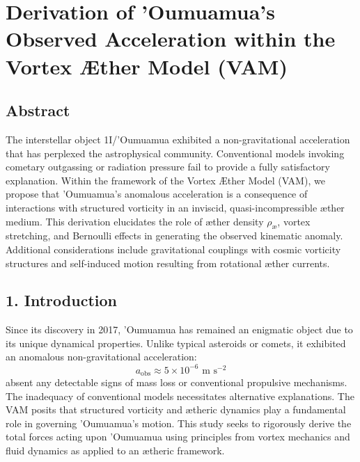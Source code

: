

    \section{Derivation of 'Oumuamua's Observed Acceleration within the Vortex Æther Model (VAM)}

    \subsection*{Abstract}
    The interstellar object 1I/'Oumuamua exhibited a non-gravitational acceleration that has perplexed the astrophysical community. Conventional models invoking cometary outgassing or radiation pressure fail to provide a fully satisfactory explanation. Within the framework of the Vortex Æther Model (VAM), we propose that 'Oumuamua's anomalous acceleration is a consequence of interactions with structured vorticity in an inviscid, quasi-incompressible æther medium. This derivation elucidates the role of æther density $\rho_\text{\ae}$, vortex stretching, and Bernoulli effects in generating the observed kinematic anomaly. Additional considerations include gravitational couplings with cosmic vorticity structures and self-induced motion resulting from rotational æther currents.

    \subsection*{1. Introduction}
    Since its discovery in 2017, 'Oumuamua has remained an enigmatic object due to its unique dynamical properties. Unlike typical asteroids or comets, it exhibited an anomalous non-gravitational acceleration:
    \begin{equation*}
        a_\text{obs} \approx 5 \times 10^{-6} \text{ m s}^{-2}
    \end{equation*}
    absent any detectable signs of mass loss or conventional propulsive mechanisms. The inadequacy of conventional models necessitates alternative explanations. The VAM posits that structured vorticity and ætheric dynamics play a fundamental role in governing 'Oumuamua's motion. This study seeks to rigorously derive the total forces acting upon 'Oumuamua using principles from vortex mechanics and fluid dynamics as applied to an ætheric framework.

